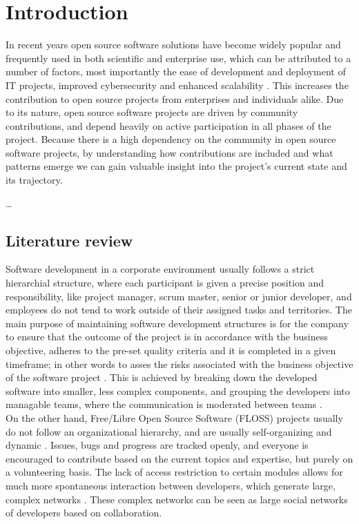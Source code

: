 \thepage
\section{Introduction}
In recent years open source software solutions have become widely popular and frequently used in both scientific and enterprise use, which can be attributed to a number of factors, most importantly the ease of development and deployment of IT projects, improved cybersecurity and enhanced scalability \cite{pwcLeadingBenefitsOpensource2016}. This increases the contribution to open source projects from enterprises and individuals alike. Due to its nature, open source software projects are driven by community contributions, and depend heavily on active participation in all phases of the project. Because there is a high dependency on the community in open source software projects, by understanding how contributions are included and what patterns emerge we can gain valuable insight into the project's current state and its trajectory.

\dots

\subsection{Literature review}
Software development in a corporate environment usually follows a strict hierarchial structure, where each participant is given a precise position and responsibility, like project manager, scrum master, senior or junior developer, and employees do not tend to work outside of their assigned tasks and territories. The main purpose of maintaining software development structures is for the company to ensure that the outcome of the project is in accordance with the business objective, adheres to the pre-set quality criteria and it is completed in a given timeframe; in other words to asses the risks associated with the business objective of the software project \cite{surekaUsingSocialNetwork2011}. This is achieved by breaking down the developed software into smaller, less complex components, and grouping the developers into managable teams, where the communication is moderated between teams \cite{birdLatentSocialStructure2008}. \\

On the other hand, Free/Libre Open Source Software (FLOSS) projects usually do not follow an organizational hierarchy, and are usually self-organizing and dynamic \cite{birdLatentSocialStructure2008}. Issues, bugs and progress are tracked openly, and everyone is encouraged to contribute based on the current topics and expertise, but purely on a volunteering basis. The lack of access restriction to certain modules allows for much more spontaneous interaction between developers, which generate large, complex networks \cite{martinez-romoUsingSocialNetwork2008}. These complex networks can be seen as large social networks of developers based on collaboration.

